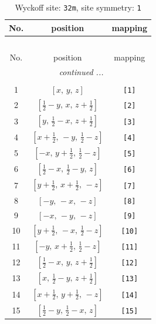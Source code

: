 \documentclass[fleqn,8pt]{jsarticle}
\begin{document}
\renewcommand{\arraystretch}{1.2}
\begin{longtable}{ccc}
\caption{Wyckoff site: {\tt 32m}, site symmetry: {\tt 1}}
 \\
 \hline \hline
No. & position & mapping \\ \hline \endfirsthead

\multicolumn{2}{l}{\tablename\ \thetable{}} \\
 \hline \hline
No. & position & mapping \\ \hline \endhead

 \hline \hline
\multicolumn{2}{r}{\footnotesize\it continued ...} \\ \endfoot

 \hline \hline
\multicolumn{2}{r}{} \\ \endlastfoot

1 & $\left[ x,\, y,\, z \right]$ & {\tt [1]} \\ \hline
2 & $\left[ \frac{1}{2} - y,\, x,\, z + \frac{1}{2} \right]$ & {\tt [2]} \\ \hline
3 & $\left[ y,\, \frac{1}{2} - x,\, z + \frac{1}{2} \right]$ & {\tt [3]} \\ \hline
4 & $\left[ x + \frac{1}{2},\, - y,\, \frac{1}{2} - z \right]$ & {\tt [4]} \\ \hline
5 & $\left[ - x,\, y + \frac{1}{2},\, \frac{1}{2} - z \right]$ & {\tt [5]} \\ \hline
6 & $\left[ \frac{1}{2} - x,\, \frac{1}{2} - y,\, z \right]$ & {\tt [6]} \\ \hline
7 & $\left[ y + \frac{1}{2},\, x + \frac{1}{2},\, - z \right]$ & {\tt [7]} \\ \hline
8 & $\left[ - y,\, - x,\, - z \right]$ & {\tt [8]} \\ \hline
9 & $\left[ - x,\, - y,\, - z \right]$ & {\tt [9]} \\ \hline
10 & $\left[ y + \frac{1}{2},\, - x,\, \frac{1}{2} - z \right]$ & {\tt [10]} \\ \hline
11 & $\left[ - y,\, x + \frac{1}{2},\, \frac{1}{2} - z \right]$ & {\tt [11]} \\ \hline
12 & $\left[ \frac{1}{2} - x,\, y,\, z + \frac{1}{2} \right]$ & {\tt [12]} \\ \hline
13 & $\left[ x,\, \frac{1}{2} - y,\, z + \frac{1}{2} \right]$ & {\tt [13]} \\ \hline
14 & $\left[ x + \frac{1}{2},\, y + \frac{1}{2},\, - z \right]$ & {\tt [14]} \\ \hline
15 & $\left[ \frac{1}{2} - y,\, \frac{1}{2} - x,\, z \right]$ & {\tt [15]} \\ \hline

\end{longtable}
\end{document}
